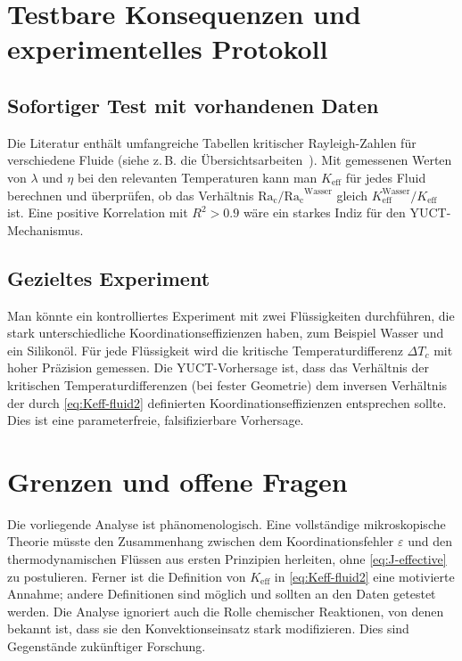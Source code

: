\documentclass[12pt,a4paper]{article}
\begin{document}
	\section{Testbare Konsequenzen und experimentelles Protokoll}
	
	\subsection{Sofortiger Test mit vorhandenen Daten}
	Die Literatur enthält umfangreiche Tabellen kritischer Rayleigh-Zahlen für verschiedene Fluide (siehe z. B. die Übersichtsarbeiten~\cite{Chandrasekhar1961, Cross1993}). Mit gemessenen Werten von \(\lambda\) und \(\eta\) bei den relevanten Temperaturen kann man \(K_{\mathrm{eff}}\) für jedes Fluid berechnen und überprüfen, ob das Verhältnis \(\mathrm{Ra_c}/\mathrm{Ra_c}^{\mathrm{Wasser}}\) gleich \(K_{\mathrm{eff}}^{\mathrm{Wasser}} / K_{\mathrm{eff}}\) ist. Eine positive Korrelation mit \(R^2 > 0.9\) wäre ein starkes Indiz für den YUCT-Mechanismus.
	
	\subsection{Gezieltes Experiment}
	Man könnte ein kontrolliertes Experiment mit zwei Flüssigkeiten durchführen, die stark unterschiedliche Koordinationseffizienzen haben, zum Beispiel Wasser und ein Silikonöl. Für jede Flüssigkeit wird die kritische Temperaturdifferenz \(\Delta T_c\) mit hoher Präzision gemessen. Die YUCT-Vorhersage ist, dass das Verhältnis der kritischen Temperaturdifferenzen (bei fester Geometrie) dem inversen Verhältnis der durch \eqref{eq:Keff-fluid2} definierten Koordinationseffizienzen entsprechen sollte. Dies ist eine parameterfreie, falsifizierbare Vorhersage.
	
	\section{Grenzen und offene Fragen}
	
	Die vorliegende Analyse ist phänomenologisch. Eine vollständige mikroskopische Theorie müsste den Zusammenhang zwischen dem Koordinationsfehler \(\varepsilon\) und den thermodynamischen Flüssen aus ersten Prinzipien herleiten, ohne \eqref{eq:J-effective} zu postulieren. Ferner ist die Definition von \(K_{\mathrm{eff}}\) in \eqref{eq:Keff-fluid2} eine motivierte Annahme; andere Definitionen sind möglich und sollten an den Daten getestet werden. Die Analyse ignoriert auch die Rolle chemischer Reaktionen, von denen bekannt ist, dass sie den Konvektionseinsatz stark modifizieren. Dies sind Gegenstände zukünftiger Forschung.
	
\end{document}
